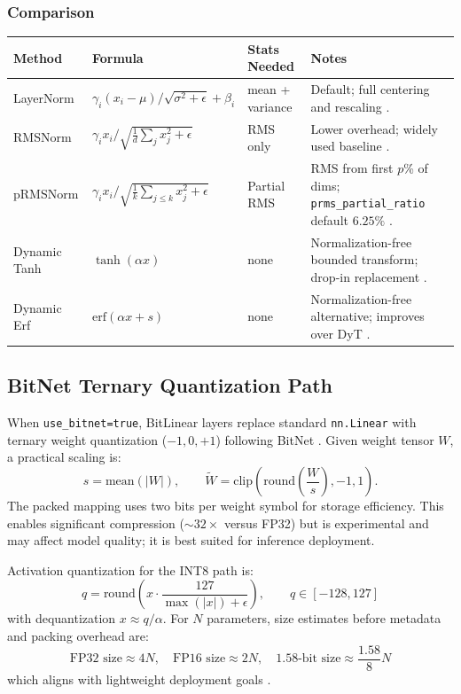 \subsubsection{Comparison}
\scriptsize
\begin{longtable}{p{2.2cm}p{3.4cm}p{2.0cm}p{4.0cm}}
\toprule
\textbf{Method} & \textbf{Formula} & \textbf{Stats Needed} & \textbf{Notes} \\
\midrule
\endhead
LayerNorm & $\gamma_i (x_i - \mu)/\sqrt{\sigma^2 + \epsilon} + \beta_i$ & mean + variance & Default; full centering and rescaling \citep{ba2016layer}. \\
RMSNorm & $\gamma_i x_i/\sqrt{\frac{1}{d}\sum_j x_j^2+\epsilon}$ & RMS only & Lower overhead; widely used baseline \citep{zhang_root_2019}. \\
pRMSNorm & $\gamma_i x_i/\sqrt{\frac{1}{k}\sum_{j\le k} x_j^2+\epsilon}$ & Partial RMS & RMS from first $p$\% of dims; \texttt{prms\_partial\_ratio} default $6.25\%$ \citep{zhang_root_2019}. \\
Dynamic Tanh & $\tanh(\alpha x)$ & none & Normalization-free bounded transform; drop-in replacement \citep{zhu_transformers_2025}. \\
Dynamic Erf & $\mathrm{erf}(\alpha x+s)$ & none & Normalization-free alternative; improves over DyT \citep{chen_stronger_2025}. \\
\bottomrule
\end{longtable}
\normalsize

\subsection{BitNet Ternary Quantization Path}

When \texttt{use\_bitnet=true}, BitLinear layers replace standard \texttt{nn.Linear} with ternary weight quantization ($-1, 0, +1$) following BitNet \citep{wang_bitnet_2023}. Given weight tensor $W$, a practical scaling is:
\[
s=\text{mean}(|W|),\qquad
\tilde{W}=\text{clip}\left(\text{round}\left(\frac{W}{s}\right),-1,1\right).
\]
The packed mapping uses two bits per weight symbol for storage efficiency. This enables significant compression ($\sim 32\times$ versus FP32) but is experimental and may affect model quality; it is best suited for inference deployment.

Activation quantization for the INT8 path is:
\[
q=\text{round}\left(x\cdot\frac{127}{\max(|x|)+\epsilon}\right),\qquad q\in[-128,127]
\]
with dequantization $x\approx q/\alpha$. For $N$ parameters, size estimates before metadata and packing overhead are:
\[
\text{FP32 size}\approx 4N,\quad \text{FP16 size}\approx 2N,\quad \text{1.58-bit size}\approx \frac{1.58}{8}N
\]
which aligns with lightweight deployment goals \citep{samson_lightweight_2026,bravin_embbert_2026}.

